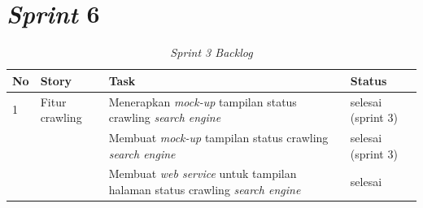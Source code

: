 %
%
%	






\section{\textit{Sprint} 6}


\begin{longtable}{@{}|p{0.5cm}|p{4cm}|p{6cm}|p{2cm}|@{}}
	\caption{\textit{Sprint 3 Backlog}}\\	
	\hline
	\textbf{No} & \textbf{Story} & \textbf{Task} & \textbf{Status} \\
	\hline
	1 & Fitur crawling & Menerapkan \textit{mock-up} tampilan status crawling \textit{search engine} & selesai (sprint 3) \\
	\cline{3-4}
	& & Membuat \textit{mock-up} tampilan status crawling \textit{search engine} & selesai (sprint 3) \\
	\cline{3-4}
	& & Membuat \textit{web service} untuk tampilan halaman status crawling \textit{search engine} & selesai \\
	\cline{3-4}
	\hline
	
\end{longtable}


